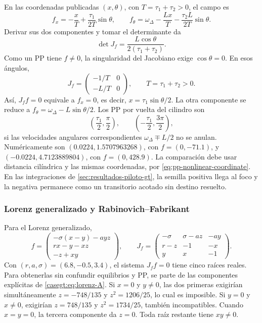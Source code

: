 En las coordenadas publicadas \((x,\theta)\), con
\(T=\tau_1+\tau_2>0\), el campo es
\[
 f_x=-\frac{x}{T}+\frac{\tau_1}{2T}\sin\theta,\qquad
 f_\theta=\omega_\Delta-\frac{Lx}{T}
                         -\frac{\tau_2L}{2T}\sin\theta.
\]
Derivar sus dos componentes y tomar el determinante da
\begin{equation}
 \det J_f=\frac{L\cos\theta}{2(\tau_1+\tau_2)}.
\end{equation}
Como un PP tiene \(f\ne0\), la singularidad del Jacobiano exige
\(\cos\theta=0\). En esos ángulos,
\[
 J_f=\begin{pmatrix}-1/T&0\\-L/T&0\end{pmatrix},\qquad
 T=\tau_1+\tau_2>0.
\]
Así, \(J_ff=0\) equivale a \(f_x=0\), es decir,
\(x=\tau_1\sin\theta/2\). La otra componente se reduce a
\(f_\theta=\omega_\Delta-L\sin\theta/2\).
Los PP por vuelta del cilindro son
\begin{equation}
 \left(\frac{\tau_1}{2},\frac\pi2\right),
 \qquad
 \left(-\frac{\tau_1}{2},\frac{3\pi}{2}\right),
 \label{eq:pp-pll}
\end{equation}
si las velocidades angulares correspondientes
\(\omega_\Delta\mp L/2\) no se anulan. Numéricamente son
\((0.0224,1.5707963268)\), con \(f=(0,-71.1)\), y
\((-0.0224,4.7123889804)\), con \(f=(0,428.9)\). La comparación debe usar
distancia cilíndrica y las mismas coordenadas, por
\cref{eq:pp-nonlinear-coordinate}. En las integraciones de
\cref{sec:resultados-piloto-gt}, la semilla positiva llega al foco y la
negativa permanece como un transitorio acotado sin destino resuelto.

\subsubsection{Lorenz generalizado y Rabinovich--Fabrikant}

Para el Lorenz generalizado,
\begin{equation}
 f=\begin{pmatrix}
 -\sigma(x-y)-ayz\\rx-y-xz\\-z+xy
 \end{pmatrix},\qquad
 J_f=\begin{pmatrix}
 -\sigma&\sigma-az&-ay\\r-z&-1&-x\\y&x&-1
 \end{pmatrix}.
\end{equation}
Con \((r,a,\sigma)=(6.8,-0.5,3.4)\), el sistema \(J_ff=0\) tiene cinco raíces
reales. Para obtenerlas sin confundir equilibrios y PP, se parte de las
componentes explícitas de \cref{casegt:eq:lorenz-A}. Si \(x=0\) y
\(y\ne0\), las dos primeras exigirían simultáneamente
\(z=-748/135\) y \(z^2=1206/25\), lo cual es imposible. Si
\(y=0\) y \(x\ne0\), exigirían \(z=748/135\) y
\(z^2=1734/25\), también incompatibles. Cuando \(x=y=0\), la tercera
componente da \(z=0\). Toda raíz restante tiene \(xy\ne0\).

